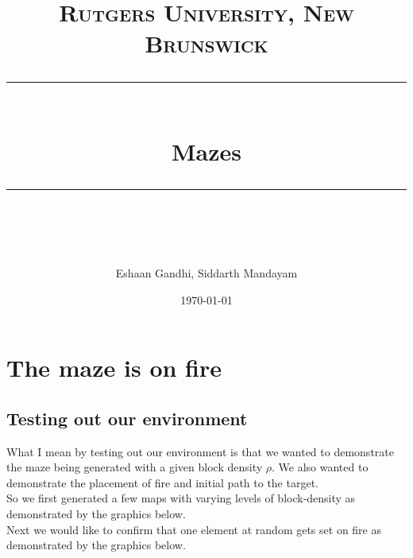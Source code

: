 \documentclass[11pt]{scrartcl} %
\title{	
	\normalfont\normalsize
	\textsc{Rutgers University, New Brunswick}\\ %
	\vspace{25pt} %
	\rule{\linewidth}{0.5pt}\\ %
	\vspace{20pt} %
	{\huge Mazes}\\ %
	\vspace{12pt} %
	\rule{\linewidth}{2pt}\\ %
	\vspace{12pt} %
}
\author{\LARGE Eshaan Gandhi, Siddarth Mandayam} %
\date{\normalsize\today} %
\newcommand{\comment}[1]{}
\begin{document}
\maketitle %

\comment{
\section{Image Interpretation}

\begin{figure}[h] %
	\centering
	\texttt{[image: swallow.jpg]} %
	\caption{European swallow.}
\end{figure}

}%

\section{The maze is on fire}

\subsection{Testing out our environment}
What I mean by testing out our environment is that we wanted to demonstrate the maze being generated with a given block density $\rho$. We also wanted to demonstrate the placement of fire and initial path to the target.\\

So we first generated a few maps with varying levels of block-density as demonstrated by the graphics below. \\


Next we would like to confirm that one element at random gets set on fire as demonstrated by the graphics below. \\

\end{document}
